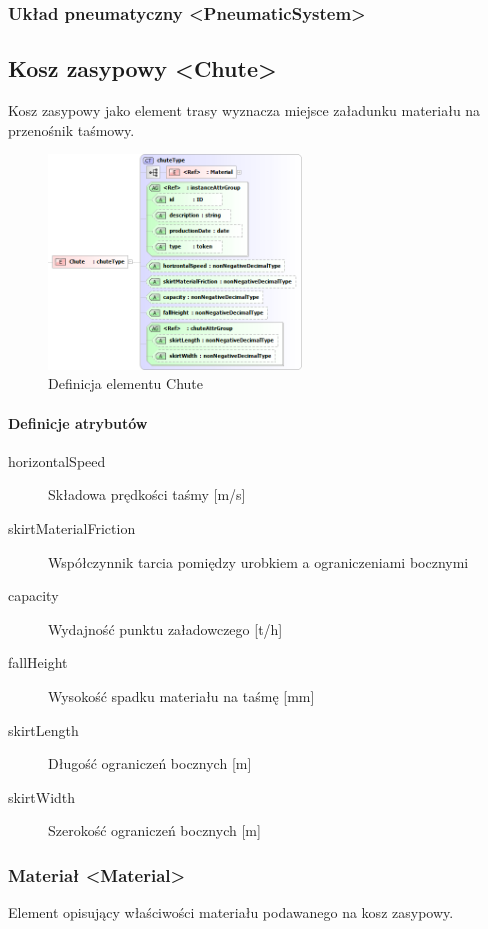 \documentclass[12pt,a4paper]{article}
\begin{document}
\subsubsection{Układ pneumatyczny <PneumaticSystem>}


\subsection{Kosz zasypowy <Chute>}
Kosz zasypowy jako element trasy wyznacza miejsce załadunku materiału na
przenośnik taśmowy.

\begin{figure}[H]
  \centering
  \includegraphics[width=0.6\textwidth]{png/liquid/Chute}
  \caption{Definicja elementu Chute}
  \label{fig:chute-xsd}
\end{figure}

\paragraph{Definicje atrybutów}
\begin{description}
\item[horizontalSpeed] Składowa prędkości taśmy [m/s]
\item[skirtMaterialFriction] Współczynnik tarcia pomiędzy urobkiem a
  ograniczeniami bocznymi
\item[capacity] Wydajność punktu załadowczego [t/h]
\item[fallHeight] Wysokość spadku materiału na taśmę [mm]
\item[skirtLength] Długość ograniczeń bocznych [m]
\item[skirtWidth] Szerokość ograniczeń bocznych [m]
\end{description}


\subsubsection{Materiał <Material>}
Element opisujący właściwości materiału podawanego na kosz zasypowy.
\end{document}
